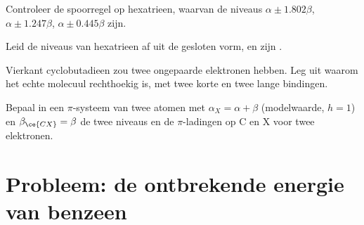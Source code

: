 \begin{exercise}[$\star\star$]\label{exo:b2:huckel:9}
Controleer de spoorregel op hexatrieen, waarvan de niveaus $\alpha \pm 1.802\beta$, $\alpha \pm
1.247\beta$, $\alpha \pm 0.445\beta$ zijn.
\end{exercise}

\begin{exercise}[$\star\star\star$]\label{exo:b2:huckel:10}
Leid de niveaus van hexatrieen af uit de gesloten vorm, en zijn .
\end{exercise}

\begin{exercise}[$\star\star\star$]\label{exo:b2:huckel:11}
Vierkant cyclobutadieen zou twee ongepaarde elektronen hebben. Leg uit waarom het echte molecuul
rechthoekig is, met twee korte en twee lange bindingen.
\end{exercise}

\begin{exercise}[$\star\star\star$]\label{exo:b2:huckel:12}
Bepaal in een $\pi$-systeem van twee atomen  met $\alpha_X = \alpha + \beta$ (modelwaarde, $h = 1$) en
$\beta_{\ce{CX}} = \beta$ de twee niveaus en de $\pi$-ladingen op C en X voor twee
elektronen.
\end{exercise}

\section{Probleem: de ontbrekende energie van benzeen}

